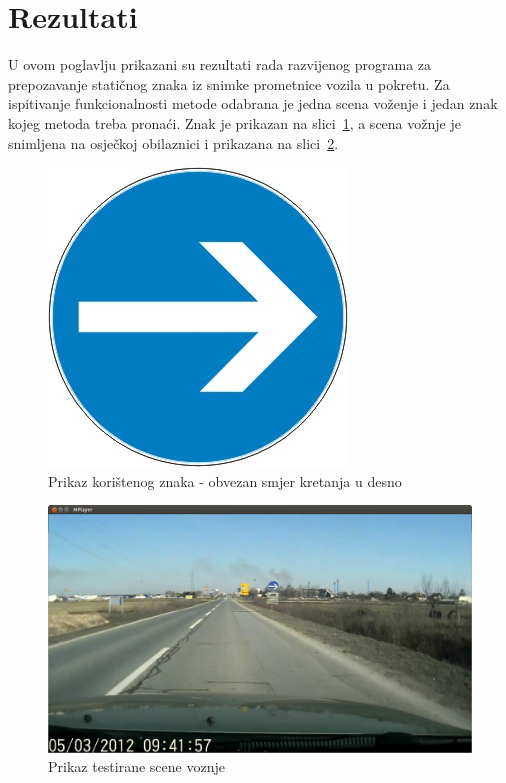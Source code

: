 \newpage
\setcounter{figure}{0}

\section{Rezultati} %
\label{sec:Rezultati}

U ovom poglavlju prikazani su rezultati rada razvijenog programa za
prepozavanje statičnog znaka iz snimke prometnice vozila u pokretu.  Za
ispitivanje funkcionalnosti metode odabrana je jedna scena voženje i
jedan znak kojeg metoda treba pronaći. Znak je prikazan na
slici~\ref{fig:znak}, a scena vožnje je snimljena na osječkoj
obilaznici i prikazana na slici~\ref{fig:scena.png}.

\begin{figure}[h]
\centering
\includegraphics[scale=0.5]{figures/znak.png}
\caption{Prikaz korištenog znaka - obvezan smjer kretanja u desno}
\label{fig:znak}
\end{figure}

\begin{figure}[h]
\centering
\includegraphics[scale=0.3]{figures/scena.png}
\caption{Prikaz testirane scene voznje}
\label{fig:scena.png}
\end{figure}

